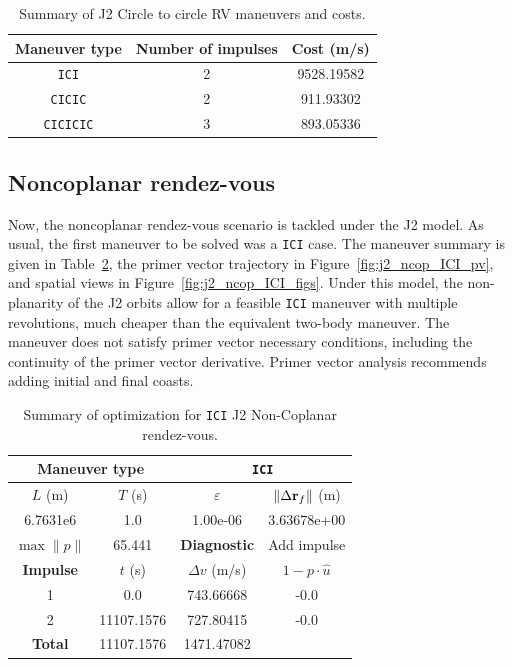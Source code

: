 \begin{table}[htbp]
    \centering
    \begin{tabular}{ccc} \toprule
        Maneuver type & Number of impulses & Cost (m/s) \\ \midrule
        \texttt{ICI} & 2 & 9528.19582 \\
        \texttt{CICIC} & 2 & 911.93302 \\
        \texttt{CICICIC} & 3 & 893.05336 \\\bottomrule
    \end{tabular}
    \caption{Summary of J2 Circle to circle RV maneuvers and costs.}
    \label{tab:J2_ctcr_summary}
\end{table}

\subsection{Noncoplanar rendez-vous}

Now, the noncoplanar rendez-vous scenario is tackled under the J2 model. As usual, the first maneuver to be solved was a \texttt{ICI} case. The maneuver summary is given in Table~\ref{tab:J2_nr_ICI_tab}, the primer vector trajectory in Figure~\ref{fig:j2_ncop_ICI_pv}, and spatial views in Figure~\ref{fig:j2_ncop_ICI_figs}. Under this model, the non-planarity of the J2 orbits allow for a feasible \texttt{ICI} maneuver with multiple revolutions, much cheaper than the equivalent two-body maneuver. The maneuver does not satisfy primer vector necessary conditions, including the continuity of the primer vector derivative. Primer vector analysis recommends adding initial and final coasts.

\begin{table}[htpb]
    \centering
    \begin{tabular}{cccc} \toprule
    \multicolumn{2}{c}{\textbf{Maneuver type}} & \multicolumn{2}{c}{\texttt{ICI}} \\ \midrule
    \(L\) (m) & \(T\) (s) & \(\varepsilon\) & \(\lVert \Delta \mathbf{r}_{f} \rVert\) (m)    \\ \midrule
    6.7631e6          & 1.0          & 1.00e-06                & 3.63678e+00                        \\ \midrule
    \(\max \lVert p \rVert\) & 65.441     & \textbf{Diagnostic}   & Add impulse        \\ \midrule
    \textbf{Impulse} & \(t\) (s) & \(\Delta v\) (m/s) & \(1 - p \cdot \hat{u}\) \\ \midrule
    1                 & 0.0          & 743.66668             & -0.0                    \\
    2                 & 11107.1576          & 727.80415             & -0.0                    \\\midrule
    \textbf{Total}   & 11107.1576          & 1471.47082             &                     \\ \bottomrule   
    \end{tabular}
    \caption{Summary of optimization for \texttt{ICI} J2 Non-Coplanar rendez-vous.}
    \label{tab:J2_nr_ICI_tab}
\end{table}

